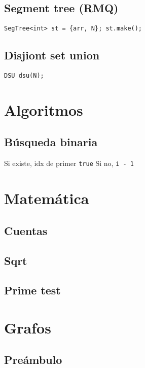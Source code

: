     \subsection{Segment tree (RMQ)}
        \texttt{SegTree<int> st = \{arr, N\}; st.make();}

    \subsection{Disjiont set union}
        \texttt{DSU dsu(N);}


\section{Algoritmos}
    \subsection{Búsqueda binaria}
        Si existe, idx de primer \texttt{true}
        Si no, \texttt{i - 1}


\section{Matemática}
    \subsection{Cuentas}

    \subsection{Sqrt}

    \subsection{Prime test}
        
\section{Grafos}
    \subsection{Preámbulo}
        
